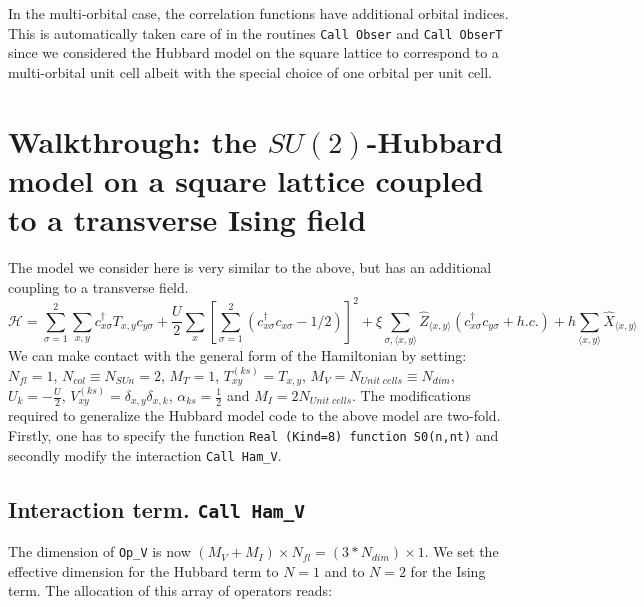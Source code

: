In the multi-orbital case,  the correlation functions have additional orbital indices. This is automatically taken care of in the routines \texttt{Call Obser} and \texttt{Call ObserT}  since  we considered the  Hubbard model on the square lattice to correspond to a multi-orbital unit cell albeit with the special choice of one orbital per unit cell. 

 
\section{Walkthrough: the $SU(2)$-Hubbard model on a square lattice coupled to a transverse Ising field}\label{sec:walk2}

The model we consider here  is very similar to the  above,  but has an additional coupling to a transverse field. 
\begin{equation}
\label{eqn_hubbard_sun_Ising}
\mathcal{H}=
\sum\limits_{\sigma=1}^{2} 
\sum\limits_{x,y } 
  c^{\dagger}_{x \sigma} T_{x,y}c^{\phantom\dagger}_{y \sigma} 
+ \frac{U}{2}\sum\limits_{x}\left[
\sum\limits_{\sigma=1}^{2}
\left(  c^{\dagger}_{x \sigma} c^{\phantom\dagger}_{x \sigma}  -1/2 \right) \right]^{2}   
+  \xi \sum_{\sigma,\langle x,y \rangle} \hat{Z}_{\langle x,y \rangle}  \left( c^{\dagger}_{x \sigma} c^{\phantom\dagger}_{y \sigma}  + h.c. \right) + h \sum_{\langle x,y \rangle} \hat{X}_{\langle x,y \rangle}
\end{equation}
We can make contact with the general form of the Hamiltonian by setting: 
$N_{fl} = 1$, $N_{col} \equiv N_{SUn}     =2 $,   $M_T    =    1$,  $T^{(ks)}_{x y}   =  T_{x,y}$,  $M_V   =  N_{Unit\; cells} \equiv N_{dim}$,  $U_{k}       =   -\frac{U}{2}$, 
 $V_{x y}^{(ks)} =  \delta_{x,y} \delta_{x,k}$,  $\alpha_{ks}   =  \frac{1}{2}  $ and $M_I       = 2 N_{Unit\; cells} $.
The modifications  required to generalize the Hubbard model code to the above model are two-fold.  Firstly, one has to specify the function \texttt{Real (Kind=8) function S0(n,nt)} and  secondly  modify the interaction \texttt{Call Ham\_V}.


\subsection{Interaction term. \texttt{Call Ham\_V}}
The dimension of   \texttt{Op\_V}  is now  $(M_V + M_I)\times N_{fl}=(3*N_{dim}) \times 1$. 
We set the effective dimension  for the Hubbard term to  $N=1$  and to  $N=2$ for the Ising term. The allocation of this array of operators reads: 

